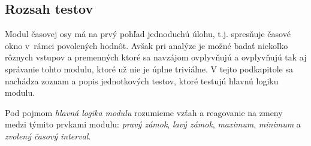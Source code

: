 \documentclass[
  digital, %
  twoside, %
  notable,   %
  nolof,   %
  nolot,   %
]{fithesis3}
\begin{document}
\subsection{Rozsah testov}
\label{sec:tests}
Modul časovej osy má na prvý pohľad jednoduchú úlohu, t.j. spresňuje časové okno v~rámci povolených hodnôt. Avšak pri analýze je možné badať niekoľko rôznych vstupov a premenných ktoré sa navzájom ovplyvňujú a ovplyvňujú tak aj správanie tohto modulu, ktoré už nie je úplne triviálne. V tejto podkapitole sa nachádza zoznam a popis jednotkových testov, ktoré testujú hlavnú logiku modulu.

Pod pojmom \textit{hlavná logika modulu} rozumieme vzťah a reagovanie na zmeny medzi týmito prvkami modulu: \textit{pravý zámok}, \textit{ľavý zámok}, \textit{maximum}, \textit{minimum} a \textit{zvolený časový interval}.
\end{document}

